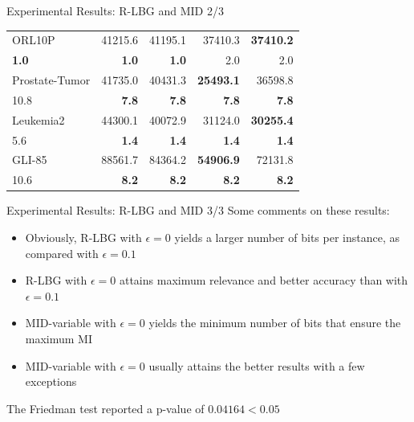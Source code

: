 \documentclass{beamer}
\begin{document}
\begin{frame}{Experimental Results: R-LBG and MID 2/3}
\begin{table} [t]
\begin{tabular}{lr|r|r|r|}
	 \multicolumn{1}{|l|}{ORL10P} & 41215.6 & 41195.1 & 37410.3  & \textbf{37410.2}  \\ \cline{2-5}
   \multicolumn{1}{|l|}{\textbf{1.0}}   & \textbf{1.0} & \textbf{1.0} & 2.0 & 2.0  \\ \hline

	 \multicolumn{1}{|l|}{Prostate-Tumor} & 41735.0 & 40431.3 & \textbf{25493.1}  & 36598.8  \\ \cline{2-5}
   \multicolumn{1}{|l|}{10.8}   & \textbf{7.8} & \textbf{7.8} & \textbf{7.8} & \textbf{7.8}  \\
\hline

	 \multicolumn{1}{|l|}{Leukemia2} & 44300.1 & 40072.9 & 31124.0  & \textbf{30255.4} \\ \cline{2-5}
   \multicolumn{1}{|l|}{5.6}   & \textbf{1.4} & \textbf{1.4} & \textbf{1.4} & \textbf{1.4}  \\
\hline

	\multicolumn{1}{|l|}{GLI-85}  & 88561.7 & 84364.2 & \textbf{54906.9} & 72131.8  \\ \cline{2-5}
\multicolumn{1}{|l|}{10.6}   & \textbf{8.2} & \textbf{8.2} & \textbf{8.2} & \textbf{8.2}  \\
\hline
\end{tabular}
\end{table}
\end{frame}


\begin{frame}{Experimental Results: R-LBG and MID 3/3}
Some comments on these results:
\begin{itemize}
	\item Obviously, R-LBG with $\epsilon=0$ yields  a larger number of bits per instance, as compared
with $\epsilon=0.1$
	
	\item R-LBG with $\epsilon=0$ attains maximum relevance and better accuracy than with $\epsilon = 0.1$

	\item MID-variable with $\epsilon=0$ yields the
minimum number of bits that ensure the maximum MI

	\item MID-variable with $\epsilon=0$ usually attains
	the better results with a few exceptions
\end{itemize}

\vfill
The Friedman test reported a p-value of $0.04164 < 0.05$
\end{frame}
\end{document}
